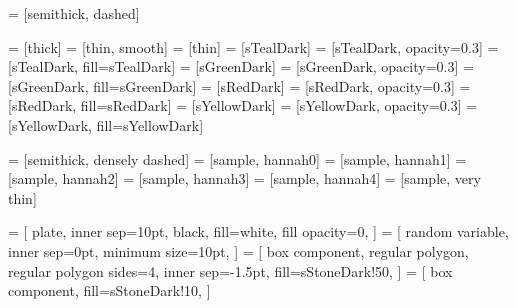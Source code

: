 
 = [semithick, dashed]

 = [thick]
 = [thin, smooth]
 = [thin]
 = [sTealDark]
 = [sTealDark, opacity=0.3]
 = [sTealDark, fill=sTealDark]
 = [sGreenDark]
 = [sGreenDark, opacity=0.3]
 = [sGreenDark, fill=sGreenDark]
 = [sRedDark]
 = [sRedDark, opacity=0.3]
 = [sRedDark, fill=sRedDark]
 = [sYellowDark]
 = [sYellowDark, opacity=0.3]
 = [sYellowDark, fill=sYellowDark]

 = [semithick, densely dashed]
 = [sample, hannah0]
 = [sample, hannah1]
 = [sample, hannah2]
 = [sample, hannah3]
 = [sample, hannah4]
 = [sample, very thin]

 = [
    plate,
    inner sep=10pt,
    black,
    fill=white,
    fill opacity=0,
]
 = [
    random variable,
    inner sep=0pt,
    minimum size=10pt,
]
 = [
    box component,
    regular polygon,
    regular polygon sides=4,
    inner sep=-1.5pt,
    fill=sStoneDark!50,
]
 = [
    box component,
    fill=sStoneDark!10,
]



